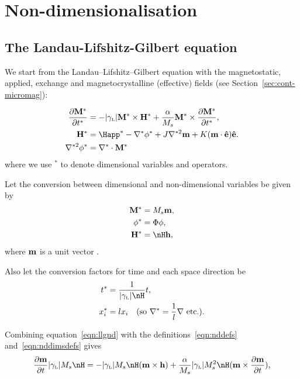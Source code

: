 
\section{Non-dimensionalisation}
\label{sec:normalisations-appendix}



\subsection{The Landau-Lifshitz-Gilbert equation}

We start from the Landau--Lifshitz--Gilbert equation with the magnetostatic, applied, exchange and magnetocrystalline (effective) fields (see Section~\ref{sec:cont-micromag}):

\begin{align}
  \pd{\Mv^*}{t^*} &= - \gymagc \Mv^* \times \Hv^* + \frac{\alpha}{M_s} \Mv^* \times \pd{\Mv^*}{t^*}, \label{eqn:llgnd} \\
  \Hv^* &= \Happ^* - \nabla^* \phi^* + J \nabla^{*2} \mv + K (\mv \cdot \ev) \ev.
  \label{eqn:effnd} \\
  \nabla^{*2} \phi^* &= \nabla^* \cdot \Mv^* \label{eqn:phind}
\end{align}
where we use $^*$ to denote dimensional variables and operators.

Let the conversion between dimensional and non-dimensional variables be given by
\begin{align}
  \Mv^* &= M_s \mv, \notag \\
  \phi^* &= \Phi \phi, \notag \\
  \Hv^* &= \nH \hv,
  \label{eqn:nddefs}
\end{align}
where $\mathbf{m}$ is a unit vector .

Also let the conversion factors for time and each space direction be
\begin{align}
  t^* &= \frac{1}{\gymagc \nH} t, \notag \\
  x_i^* &= l x_i \quad (\text{so } \nabla^* = \frac{1}{l} \nabla \text{ etc.}).
  \label{eqn:nddimsdefs}
\end{align}

Combining equation~\eqref{eqn:llgnd} with the definitions~\eqref{eqn:nddefs} and~\eqref{eqn:nddimsdefs} gives
\begin{equation}
  \notag
  \dmdt \gymagc M_s \nH =
  - \gymagc M_s \nH (\mv \times \hv) + \frac{\alpha}{M_s} \gymagc M_s^2 \nH (\mv \times \dmdt),
\end{equation}

